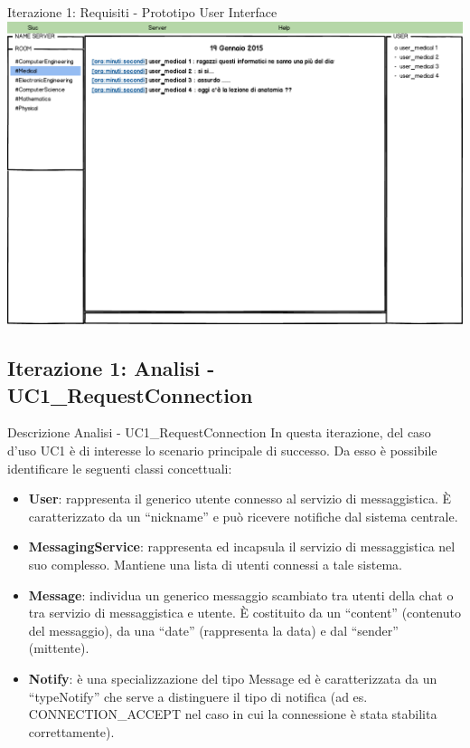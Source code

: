 \begin{frame} {Iterazione 1: Requisiti - Prototipo User Interface}
    \includegraphics[scale=0.28]{image_mockups/09_snuc_user_room_medical.png}{\centering}
\end{frame}

\subsection{Iterazione 1: Analisi - UC1\_RequestConnection}
\begin{frame}[allowframebreaks] {Descrizione Analisi - UC1\_RequestConnection}
 In questa iterazione, del caso d’uso UC1 è di interesse lo scenario principale di successo.  Da esso è possibile identificare le seguenti classi concettuali: 	
 \begin{itemize}
  \item \textbf{User}: rappresenta il generico utente connesso al servizio di messaggistica. È caratterizzato da un ``nickname'' e può ricevere notifiche dal sistema 
                centrale.
  \item \textbf{MessagingService}: rappresenta ed incapsula il servizio di messaggistica nel suo complesso. Mantiene una lista di utenti connessi a tale sistema.
  \item \textbf{Message}: individua un generico messaggio scambiato tra utenti della chat o tra servizio di messaggistica e utente. È costituito da un 
               ``content'' (contenuto del messaggio), da una ``date'' (rappresenta la data) e dal ``sender'' (mittente).
  \item \textbf{Notify}: è una specializzazione del tipo Message ed è caratterizzata da un ``typeNotify'' che serve a distinguere il tipo di notifica (ad es. 
        CONNECTION\_ACCEPT nel caso in cui la connessione è stata stabilita correttamente).        
 \end{itemize}
\end{frame}

